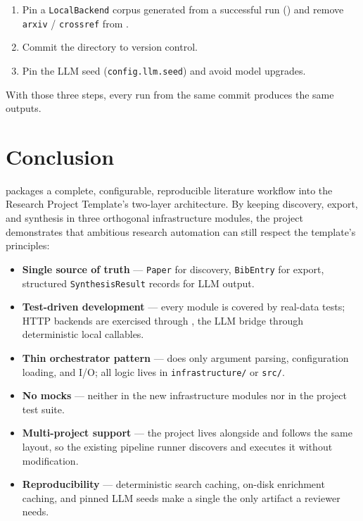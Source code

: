 \documentclass[
]{article}
\providecommand{\tightlist}{%
  \setlength{\itemsep}{0pt}\setlength{\parskip}{0pt}}
\begin{document}
\begin{enumerate}
\def\labelenumi{\arabic{enumi}.}
\tightlist
\item
  Pin a \texttt{LocalBackend} corpus generated from a successful run
  () and remove
  \texttt{arxiv} / \texttt{crossref} from
  .
\item
  Commit the  directory to version control.
\item
  Pin the LLM seed (\texttt{config.llm.seed}) and avoid model upgrades.
\end{enumerate}

With those three steps, every run from the same commit produces the same
outputs.

\newpage

\section{Conclusion}\label{sec:conclusion}

 packages a complete, configurable,
reproducible literature workflow into the Research Project Template's
two-layer architecture. By keeping discovery, export, and synthesis in
three orthogonal infrastructure modules, the project demonstrates that
ambitious research automation can still respect the template's
principles:

\begin{itemize}
\tightlist
\item
  \textbf{Single source of truth} --- \texttt{Paper} for discovery,
  \texttt{BibEntry} for export, structured \texttt{SynthesisResult}
  records for LLM output.
\item
  \textbf{Test-driven development} --- every module is covered by
  real-data tests; HTTP backends are exercised through
  , the LLM bridge through deterministic local
  callables.
\item
  \textbf{Thin orchestrator pattern} ---
   does only argument parsing,
  configuration loading, and I/O; all logic lives in
  \texttt{infrastructure/} or \texttt{src/}.
\item
  \textbf{No mocks} --- neither in the new infrastructure modules nor in
  the project test suite.
\item
  \textbf{Multi-project support} --- the project lives alongside
   and follows the same layout, so the
  existing pipeline runner discovers and executes it without
  modification.
\item
  \textbf{Reproducibility} --- deterministic search caching, on-disk
  enrichment caching, and pinned LLM seeds make a single
   the only artifact a reviewer needs.
\end{itemize}
\end{document}
